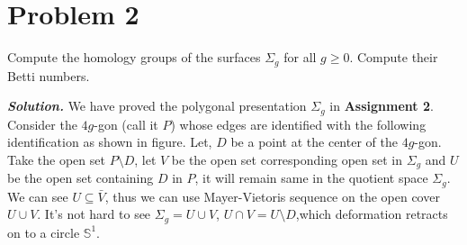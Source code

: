 \documentclass[11pt]{article}
\newcommand{\bb}[1]{\mathbb{#1}}
\newcommand{\s}{\bb{S}}
\newcommand{\sol}{ \textbf{\textit{Solution.}} }
\begin{document}
 \section{Problem 2}

 \begin{prob}{}{}
    Compute the homology groups of the surfaces $\Sigma_{g}$ for all $g \geq 0$. Compute their Betti numbers.
 \end{prob}

 \sol We have proved the polygonal presentation $\Sigma_g$ in \textbf{Assignment 2}. Consider the $4g$-gon (call it $P$) whose edges are identified with the following identification as shown in figure. Let, $D$ be a  point at the center of the $4g$-gon. Take the open set $P \setminus D$,  let $V$ be the open set corresponding open set in $\Sigma_g$ and $U$ be the open set containing $D$ in $P$, it will remain same in the quotient space $\Sigma_g$. We can see $U \subseteq \bar{V}$, thus we can use Mayer-Vietoris sequence on the open cover $U \cup V$. It's not hard to see $\Sigma_g = U \cup V$, $U \cap V = U \setminus D$,which deformation retracts on to a circle $\s^1$.   
\end{document}
